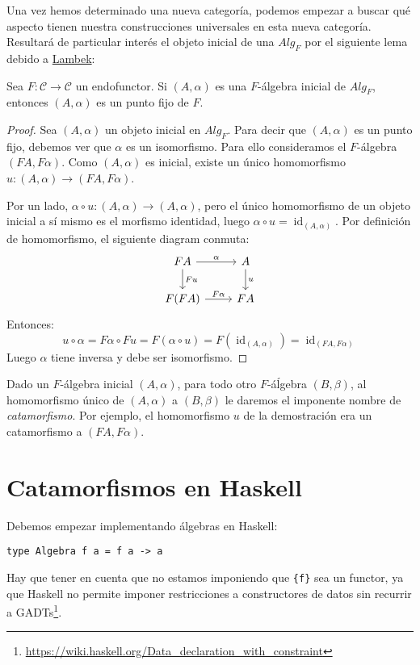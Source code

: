 \documentclass[12pt, twoside]{book}
\newcommand{\newterm}[1]{\index{#1}\emph{#1}}
\newcommand{\code}[1]{\Verb+{#1}+}
\newcommand{\cat}{{\mathcal{C}}}
\DeclareMathOperator{\id}{id}
\begin{document}
Una vez hemos determinado una nueva categoría, podemos empezar a buscar qué aspecto tienen nuestra construcciones universales en esta nueva categoría.
Resultará de particular interés el objeto inicial de una $Alg_F$ por el siguiente lema debido a \hyperref[lambek-pf]{Lambek}:

\begin{lemma}\label{lambek-lemma}
Sea $F \colon \cat \to \cat$ un endofunctor.
Si $(A,\alpha)$ es una $F$-álgebra inicial de $Alg_F$, entonces $(A,\alpha)$ es un punto fijo de $F$.
\end{lemma}
\begin{proof}
Sea $(A,\alpha)$ un objeto inicial en $Alg_F$.
Para decir que $(A,\alpha)$ es un punto fijo, debemos ver que $\alpha$ es un isomorfismo.
Para ello consideramos el $F$-álgebra $(F A, F \alpha)$.
Como $(A,\alpha)$ es inicial, existe un único homomorfismo $u \colon (A, \alpha) \to (F A, F \alpha)$.

Por un lado, $\alpha \circ u \colon (A, \alpha) \to (A, \alpha)$, pero el único homomorfismo de un objeto inicial a sí mismo es el morfismo identidad, luego $\alpha \circ u = \id_{(A, \alpha)}$.
Por definición de homomorfismo, el siguiente diagram conmuta:
\[
\begin{tikzcd}
F A \arrow[r,"\alpha"] \arrow[d,"F u"] & A \arrow[d,"u"]\\
F (F A) \arrow[r,"F \alpha"] & F A
\end{tikzcd}
\]
Entonces:
\[ u \circ \alpha = F \alpha \circ F u = F (\alpha \circ u) = F (\id_{(A, \alpha)}) = \id_{(F A, F \alpha)} \]
Luego $\alpha$ tiene inversa y debe ser isomorfismo.
\end{proof}

Dado un $F$-álgebra inicial $(A,\alpha)$, para todo otro $F$-áĺgebra $(B,\beta)$, al homomorfismo único de $(A,\alpha)$ a $(B,\beta)$ le daremos el imponente nombre de \newterm{catamorfismo}.
Por ejemplo, el homomorfismo $u$ de la demostración era un catamorfismo a $(F A, F \alpha)$.

\section{Catamorfismos en Haskell}

Debemos empezar implementando álgebras en Haskell:
\begin{verbatim}
type Algebra f a = f a -> a
\end{verbatim}
Hay que tener en cuenta que no estamos imponiendo que \code{f} sea un functor, ya que Haskell no permite imponer restricciones a constructores de datos sin recurrir a GADTs\footnote{\url{https://wiki.haskell.org/Data_declaration_with_constraint}}.
\end{document}
